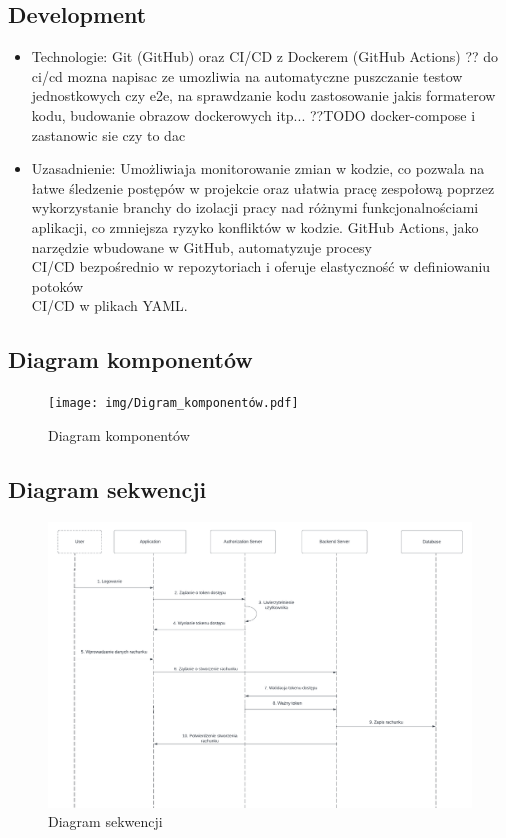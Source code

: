 \documentclass[12pt,titlepage]{article}
\begin{document}
\subsection{Development}
\begin{itemize}
    \item Technologie: Git (GitHub) oraz CI/CD z Dockerem (GitHub Actions) ?? do ci/cd mozna napisac ze umozliwia na automatyczne puszczanie testow jednostkowych czy e2e, na sprawdzanie kodu zastosowanie jakis formaterow kodu, budowanie obrazow dockerowych itp... ??TODO docker-compose i zastanowic sie czy to dac
    \item Uzasadnienie: Umożliwiaja monitorowanie zmian w kodzie, co pozwala na łatwe śledzenie postępów w projekcie oraz ułatwia pracę zespołową poprzez wykorzystanie branchy do izolacji pracy nad różnymi funkcjonalnościami aplikacji, co zmniejsza ryzyko konfliktów w kodzie. GitHub Actions, jako narzędzie wbudowane w GitHub, automatyzuje procesy \\ CI/CD bezpośrednio w repozytoriach i oferuje elastyczność w definiowaniu potoków \\ CI/CD w plikach YAML. 
\end{itemize}


\subsection{Diagram komponentów}

\begin{figure}[!h]
    \centering
    \texttt{[image: img/Digram\_komponentów.pdf]}
    \caption{Diagram komponentów}
    \label{fig:mesh1}
\end{figure}
\newpage
\subsection{Diagram sekwencji}

\begin{figure}[!h]
    \centering
    \includegraphics[width=1\textwidth]{img/Diagram sekwencji.pdf}
    \caption{Diagram sekwencji}
    \label{fig:mesh1}
\end{figure}
\end{document}
